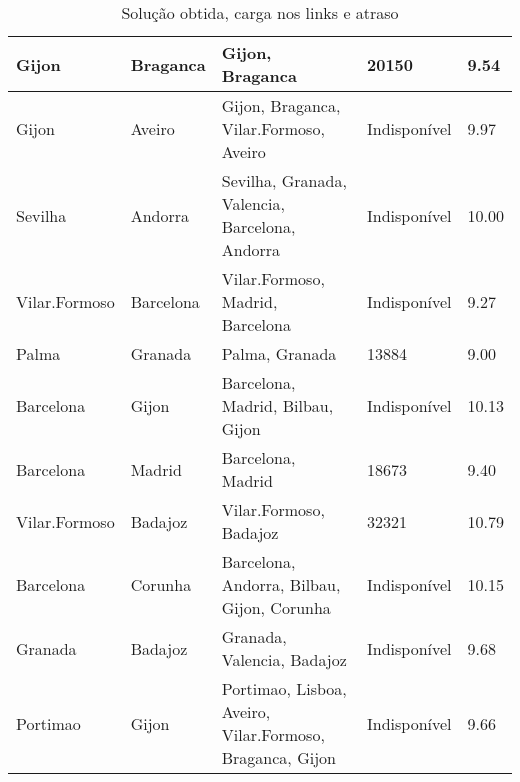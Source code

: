 \begin{table}[!htb]
{\begin{tabular}{|l|l|l|l|l|}
Gijon & Braganca & Gijon, Braganca & 20150 & 9.54 \\ \hline
Gijon & Aveiro & Gijon, Braganca, Vilar.Formoso, Aveiro & Indisponível & 9.97 \\ \hline
Sevilha & Andorra & Sevilha, Granada, Valencia, Barcelona, Andorra & Indisponível & 10.00 \\ \hline
Vilar.Formoso & Barcelona & Vilar.Formoso, Madrid, Barcelona & Indisponível & 9.27 \\ \hline
Palma & Granada & Palma, Granada & 13884 & 9.00 \\ \hline
Barcelona & Gijon & Barcelona, Madrid, Bilbau, Gijon & Indisponível & 10.13 \\ \hline
Barcelona & Madrid & Barcelona, Madrid & 18673 & 9.40 \\ \hline
Vilar.Formoso & Badajoz & Vilar.Formoso, Badajoz & 32321 & 10.79 \\ \hline
Barcelona & Corunha & Barcelona, Andorra, Bilbau, Gijon, Corunha & Indisponível & 10.15 \\ \hline
Granada & Badajoz & Granada, Valencia, Badajoz & Indisponível & 9.68 \\ \hline
Portimao & Gijon & Portimao, Lisboa, Aveiro, Vilar.Formoso, Braganca, Gijon & Indisponível & 9.66 \\ \hline
\end{tabular}}
\caption[]{Solução obtida, carga nos links e atraso}
\end{table}

